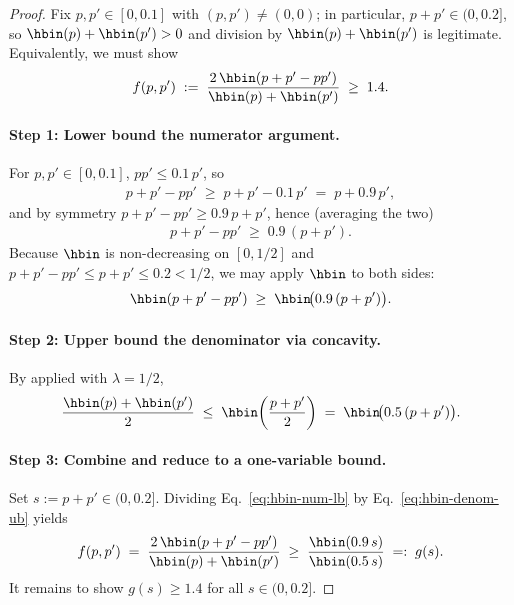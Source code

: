 \begin{proof}
Fix $p, p' \in [0, 0.1]$ with $(p, p') \ne (0, 0)$; in particular,
$p + p' \in (0, 0.2]$, so $\hbin(p) + \hbin(p') > 0$ and division by
$\hbin(p) + \hbin(p')$ is legitimate. Equivalently, we must show
\begin{align}\label{eq:hbin-low-equiv}
f(p, p') \;:=\; \frac{2 \, \hbin(p + p' - p p')}{\hbin(p) + \hbin(p')} \;\ge\; 1.4.
\end{align}

\paragraph{Step 1: Lower bound the numerator argument.}
For $p, p' \in [0, 0.1]$, $p p' \le 0.1 \, p'$, so
\begin{align*}
p + p' - p p' \;\ge\; p + p' - 0.1 \, p' \;=\; p + 0.9 \, p',
\end{align*}
and by symmetry $p + p' - p p' \ge 0.9 \, p + p'$, hence (averaging the two)
\begin{align*}
p + p' - p p' \;\ge\; 0.9 \, (p + p').
\end{align*}
Because $\hbin$ is non-decreasing on $[0, 1/2]$ and $p + p' - p p' \le p + p' \le 0.2 < 1/2$,
we may apply $\hbin$ to both sides:
\begin{align}\label{eq:hbin-num-lb}
\hbin(p + p' - p p') \;\ge\; \hbin\!\bigl( 0.9 \, (p + p') \bigr).
\end{align}

\paragraph{Step 2: Upper bound the denominator via concavity.}
By  applied with $\lambda = 1/2$,
\begin{align}\label{eq:hbin-denom-ub}
\frac{\hbin(p) + \hbin(p')}{2} \;\le\; \hbin\!\left( \frac{p + p'}{2} \right)
\;=\; \hbin\!\bigl( 0.5 \, (p + p') \bigr).
\end{align}

\paragraph{Step 3: Combine and reduce to a one-variable bound.}
Set $s := p + p' \in (0, 0.2]$. Dividing Eq.~\eqref{eq:hbin-num-lb} by
Eq.~\eqref{eq:hbin-denom-ub} yields
\begin{align}\label{eq:hbin-univariate}
f(p, p') \;=\; \frac{2 \, \hbin(p + p' - p p')}{\hbin(p) + \hbin(p')}
\;\ge\; \frac{\hbin(0.9 \, s)}{\hbin(0.5 \, s)} \;=:\; g(s).
\end{align}
It remains to show $g(s) \ge 1.4$ for all $s \in (0, 0.2]$.


\end{proof}
